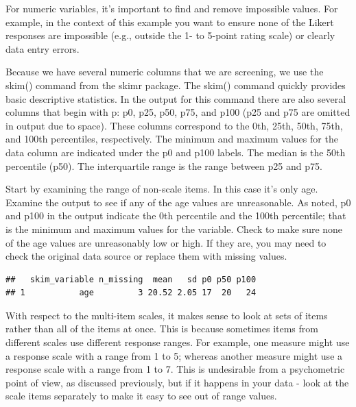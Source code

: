 \documentclass[
]{krantz}
\makeatletter
\newenvironment{Shaded}{\begin{snugshade}}{\end{snugshade}}
\newcommand{\KeywordTok}[1]{\textcolor[rgb]{0.27,0.27,0.27}{\textbf{#1}}}
\newcommand{\NormalTok}[1]{#1}
\newcommand{\OperatorTok}[1]{\textcolor[rgb]{0.43,0.43,0.43}{\textbf{#1}}}
\newcommand{\StringTok}[1]{\textcolor[rgb]{0.5,0.5,0.5}{#1}}
\newenvironment{kframe}{%
\medskip{}
\setlength{\fboxsep}{.8em}
 \def\at@end@of@kframe{}%
 \ifinner\ifhmode%
  \def\at@end@of@kframe{\end{minipage}}%
  \begin{minipage}{\columnwidth}%
 \fi\fi%
 \def\FrameCommand##1{\hskip\@totalleftmargin \hskip-\fboxsep
 \colorbox{shadecolor}{##1}\hskip-\fboxsep
     \hskip-\linewidth \hskip-\@totalleftmargin \hskip\columnwidth}%
 \MakeFramed {\advance\hsize-\width
   \@totalleftmargin\z@ \linewidth\hsize
   \@setminipage}}%
 {\par\unskip\endMakeFramed%
 \at@end@of@kframe}
\renewenvironment{Shaded}{\begin{kframe}}{\end{kframe}}
\makeatother
\begin{document}
For numeric variables, it's important to find and remove impossible values. For example, in the context of this example you want to ensure none of the Likert responses are impossible (e.g., outside the 1- to 5-point rating scale) or clearly data entry errors.

Because we have several numeric columns that we are screening, we use the skim() command from the skimr package. The skim() command quickly provides basic descriptive statistics. In the output for this command there are also several columns that begin with p: p0, p25, p50, p75, and p100 (p25 and p75 are omitted in output due to space). These columns correspond to the 0th, 25th, 50th, 75th, and 100th percentiles, respectively. The minimum and maximum values for the data column are indicated under the p0 and p100 labels. The median is the 50th percentile (p50). The interquartile range is the range between p25 and p75.

Start by examining the range of non-scale items. In this case it's only age. Examine the output to see if any of the age values are unreasonable. As noted, p0 and p100 in the output indicate the 0th percentile and the 100th percentile; that is the minimum and maximum values for the variable. Check to make sure none of the age values are unreasonably low or high. If they are, you may need to check the original data source or replace them with missing values.

\begin{Shaded}
\end{Shaded}

\begin{verbatim}
##   skim_variable n_missing  mean   sd p0 p50 p100
## 1           age         3 20.52 2.05 17  20   24
\end{verbatim}

With respect to the multi-item scales, it makes sense to look at sets of items rather than all of the items at once. This is because sometimes items from different scales use different response ranges. For example, one measure might use a response scale with a range from 1 to 5; whereas another measure might use a response scale with a range from 1 to 7. This is undesirable from a psychometric point of view, as discussed previously, but if it happens in your data - look at the scale items separately to make it easy to see out of range values.
\end{document}
